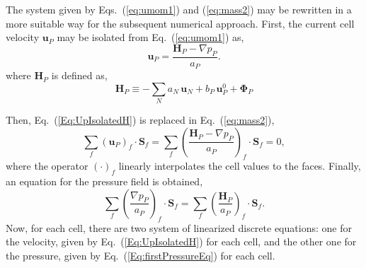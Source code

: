 \documentclass[final,3p,times,11pt,onecolumn]{myElsarticle}
\numberwithin{equation}{section}
\begin{document}
The system given by Eqs.~(\ref{eq:umom1}) and (\ref{eq:mass2}) may be rewritten in a more suitable way for the subsequent numerical approach. First, the current cell velocity $\boldsymbol{u}_{P}$ may be isolated from Eq.~(\ref{eq:umom1}) as,
\begin{equation}
\label{Eq:UpIsolatedH}
\boldsymbol{u}_P
=
\dfrac
{
\boldsymbol{H}_P
- 
\nabla p_P}
{a_P}.
\end{equation}
\noindent where $\boldsymbol{H}_P$ is defined as,
\begin{equation}
\boldsymbol{H}_P
\equiv
-\sum_{N} a_{N}\,\boldsymbol{u}_{N}
+
b_P\, \boldsymbol{u}^0_P 
+ 
\boldsymbol{\Phi}_P
\end{equation}

Then, Eq.~(\ref{Eq:UpIsolatedH}) is replaced in Eq.~(\ref{eq:mass2}),
\begin{equation}
\sum_{f} 
\left(
\boldsymbol{u}_{P} 
\right)_f
\cdotp 
\textbf{S}_{f} 
=
\sum_{f} 
\left(
\dfrac
{
\boldsymbol{H}_P
- 
\nabla p_P}
{a_P}
\right)_f
\cdotp 
\textbf{S}_{f}
= 
0,
\end{equation}
where the operator $(\cdot)_f$ linearly interpolates the cell values to the faces. Finally, an equation for the pressure field is obtained,
\begin{equation}
\label{Eq:firstPressureEq}
\sum_{f} 
\left(
\dfrac
{
\nabla p_P}
{a_P}
\right)_f
\cdotp 
\textbf{S}_{f}
=
\sum_{f} 
\left(
\dfrac
{
\boldsymbol{H}_P
}
{a_P}
\right)_f
\cdotp 
\textbf{S}_{f}.
\end{equation}
Now, for each cell, there are two system of linearized discrete equations: one for the velocity, given by Eq.~(\ref{Eq:UpIsolatedH}) for each cell, and the other one for the pressure, given by Eq.~(\ref{Eq:firstPressureEq}) for each cell.
\end{document}
